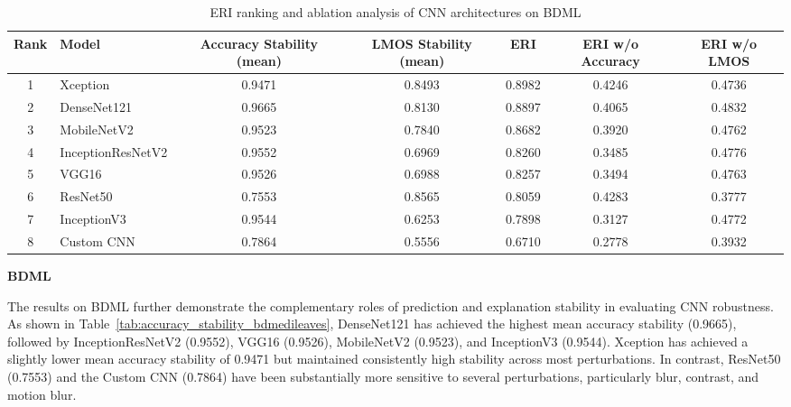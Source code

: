 \documentclass[a4paper,fleqn]{cas-dc}
\begin{document}
\begin{table}[t]
\centering
\caption{ERI ranking and ablation analysis of CNN architectures on BDML}
\label{tab:eri_ablation_ranking_bdmedileaves}

\scriptsize
\setlength{\tabcolsep}{5pt}
\renewcommand{\arraystretch}{1.15}

\begin{tabular}{|c|l|c|c|c|c|c|}
\hline
\textbf{Rank} &
\textbf{Model} &
\textbf{Accuracy Stability (mean)} &
\textbf{LMOS Stability (mean)} &
\textbf{ERI} &
\textbf{ERI w/o Accuracy} &
\textbf{ERI w/o LMOS} \\
\hline

1 & Xception
&0.9471&0.8493&0.8982&0.4246&0.4736\\

2 & DenseNet121
&0.9665&0.8130&0.8897&0.4065&0.4832\\

3 & MobileNetV2
&0.9523&0.7840&0.8682&0.3920&0.4762\\

4 & InceptionResNetV2
&0.9552&0.6969&0.8260&0.3485&0.4776\\

5 & VGG16
&0.9526&0.6988&0.8257&0.3494&0.4763\\

6 & ResNet50
&0.7553&0.8565&0.8059&0.4283&0.3777\\

7 & InceptionV3
&0.9544&0.6253&0.7898&0.3127&0.4772\\

8 & Custom CNN
&0.7864&0.5556&0.6710&0.2778&0.3932\\

\hline
\end{tabular}
\end{table}


\noindent\textbf{BDML}

The results on BDML further demonstrate the complementary roles of prediction and explanation stability in evaluating CNN robustness. As shown in   Table~\ref{tab:accuracy_stability_bdmedileaves}, DenseNet121 has achieved the highest mean accuracy stability (0.9665), followed by InceptionResNetV2 (0.9552), VGG16 (0.9526), MobileNetV2 (0.9523), and InceptionV3 (0.9544). Xception has achieved a slightly lower mean accuracy stability of 0.9471 but maintained consistently high stability across most perturbations. In contrast, ResNet50 (0.7553) and the Custom CNN (0.7864) have been substantially more sensitive to several perturbations, particularly blur, contrast, and motion blur.
\end{document}
